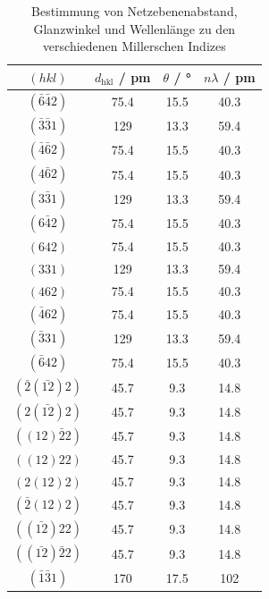 \begin{table}[H]
    \centering
    \caption{Bestimmung von Netzebenenabstand, Glanzwinkel und Wellenlänge zu den verschiedenen Millerschen Indizes}
    \begin{tabular}{c|c|c|c}
        $(hkl)$ & $d_{\mathrm{hkl}}$ / \unit{\pico \meter} & $\theta$ / \unit{\degree} & $n \lambda$ / \unit{\pico \meter} \\
        \hline
        $(\bar{6}\bar{4}2)$ & \num{75,4} & \num{15,5} & \num{40,3} \\
        $(\bar{3}\bar{3}1)$ & \num{129} & \num{13,3} & \num{59,4} \\
        $(\bar{4}\bar{6}2)$ & \num{75,4} & \num{15,5} & \num{40,3} \\
        $(4\bar{6}2)$ & \num{75,4} & \num{15,5} & \num{40,3} \\
        $(3\bar{3}1)$ & \num{129} & \num{13,3} & \num{59,4} \\
        $(6\bar{4}2)$ & \num{75,4} & \num{15,5} & \num{40,3} \\
        $(642)$ & \num{75,4} & \num{15,5} & \num{40,3} \\
        $(331)$ & \num{129} & \num{13,3} & \num{59,4} \\
        $(462)$ & \num{75,4} & \num{15,5} & \num{40,3} \\
        $(\bar{4}62)$ & \num{75,4} & \num{15,5} & \num{40,3} \\
        $(\bar{3}31)$ & \num{129} & \num{13,3} & \num{59,4} \\
        $(\bar{6}42)$ & \num{75,4} & \num{15,5} & \num{40,3} \\
        $(\bar{2}(\bar{12})2)$ & \num{45,7} & \num{9,3} & \num{14,8} \\
        $(2(\bar{12})2)$ & \num{45,7} & \num{9,3} & \num{14,8} \\
        $((12)\bar{2}2)$ & \num{45,7} & \num{9,3} & \num{14,8} \\
        $((12)22)$ & \num{45,7} & \num{9,3} & \num{14,8} \\
        $(2(12)2)$ & \num{45,7} & \num{9,3} & \num{14,8} \\
        $(\bar{2}(12)2)$ & \num{45,7} & \num{9,3} & \num{14,8} \\
        $((\bar{12})22)$ & \num{45,7} & \num{9,3} & \num{14,8} \\
        $((\bar{12})\bar{2}2)$ & \num{45,7} & \num{9,3} & \num{14,8} \\
        $(\bar{1}\bar{3}1)$ & \num{170} & \num{17,5} & \num{102} \\

\end{tabular}
\end{table}
